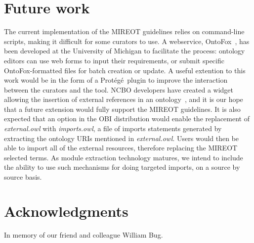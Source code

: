 \documentclass[jou]{ao2e}%
\newcommand{\protege}{Prot\'{e}g\'{e}}
\begin{document}
\section*{Future work}
The current implementation of the \ac{MIREOT} guidelines relies on command-line scripts, making it difficult for some curators to use. 
A webservice, OntoFox~\citep{OntoFox}, has been developed at the University of Michigan to facilitate the process: ontology editors can use web forms to input their requirements, or submit specific OntoFox-formatted files for batch creation or update.
A useful extention to this work would be in the form of a \protege\  plugin to improve the interaction between the curators and the tool. NCBO developers have created a widget allowing the insertion of external references in an ontology~\citep{NCBOWidget}, and it is our hope that a future extension would fully support the MIREOT guidelines.
It is also expected that an option in the \ac{OBI} distribution would enable the replacement of \emph{external.owl} with \emph{imports.owl}, a file of imports statements generated by extracting the ontology URIs mentioned in \emph{external.owl}. Users would then be able to import all of the external resources, therefore replacing the MIREOT selected terms.  As module extraction technology matures, we intend to include the ability to use such mechanisms for doing targeted imports, on a source by source basis.%



\section*{Acknowledgments}

In memory of our friend and colleague William Bug. 
\end{document}
